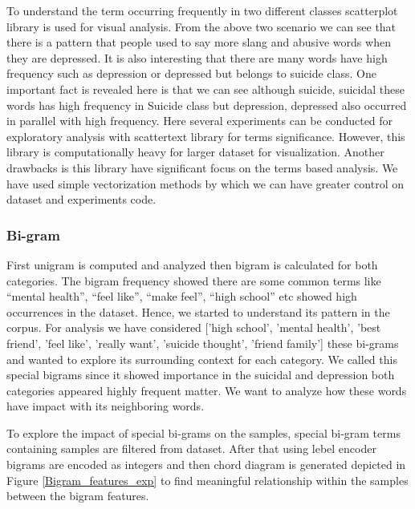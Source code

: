 \documentclass[sn-mathphys,Numbered]{sn-jnl}%
\theoremstyle{thmstyleone}%
\theoremstyle{thmstyletwo}%
\theoremstyle{thmstylethree}%
\begin{document}
To understand the term occurring frequently in two different classes scatterplot library is used for visual analysis. From the above two scenario we can see that there is a pattern that people used to say more slang and abusive words when they are depressed. It is also interesting that there are many words have high frequency such as depression or depressed but belongs to suicide class. One important fact is revealed here is that we can see although suicide, suicidal these words has high frequency in Suicide class but depression, depressed also occurred in parallel with high frequency. Here several experiments can be conducted for exploratory analysis with scattertext library for terms significance. However, this library is computationally heavy for larger dataset for visualization. Another drawbacks is this library have significant focus on the terms based analysis. We have used simple vectorization methods by which we can have greater control on dataset and experiments code. 

\subsubsection{Bi-gram}
First unigram is computed and analyzed then bigram is calculated for both categories. The bigram frequency showed there are some common terms like “mental health”, “feel like”, “make feel”, “high school” etc showed high occurrences in the dataset. Hence, we started to understand its pattern in the corpus. For analysis we have considered ['high school', 'mental health', 'best friend', 'feel like', 'really want', 'suicide thought', 'friend family'] these bi-grams and wanted to explore its surrounding context for each category. We called this special bigrams since it showed importance in the suicidal and depression both categories appeared highly frequent matter. We want to analyze how these words have impact with its neighboring words. 

To explore the impact of special bi-grams on the samples, special bi-gram terms containing samples are filtered from dataset. After that using lebel encoder bigrams are encoded as integers and then chord diagram is generated  depicted in Figure \ref{Bigram_features_exp} to find meaningful relationship within the samples between the bigram features.  


\end{document}
